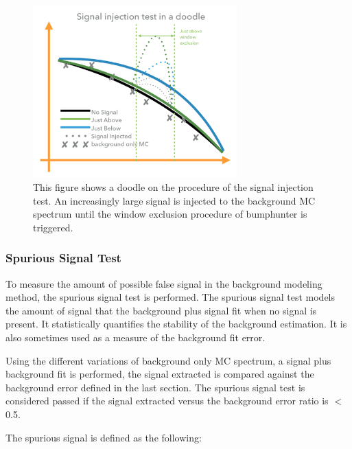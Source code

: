 \begin{figure}[!htb]
    \begin{center}
        \includegraphics[width=0.7\textwidth]{figures/chapter_analysismethod/SignalInjectionTest}
        \caption{
            This figure shows a doodle on the procedure of the signal injection test. An increasingly large signal is injected to the background MC spectrum until the window exclusion procedure of bumphunter is triggered.
        }
        \label{signalinjection}
    \end{center}
\end{figure}
\FloatBarrier

\subsubsection{Spurious Signal Test} 
    \label{sec:spurious}

    To measure the amount of possible false signal in the background modeling method, the spurious signal test is performed. The spurious signal test models the amount of signal that the background plus signal fit when no signal is present.  It statistically quantifies the stability of the background estimation. It is also sometimes used as a measure of the background fit error.

Using the different variations of background only MC spectrum, a signal plus background fit is performed, the signal extracted is compared against the background error defined in the last section. The spurious signal test is considered passed if the signal extracted versus the background error ratio is $<$ 0.5.

    The spurious signal is defined as the following:
    
